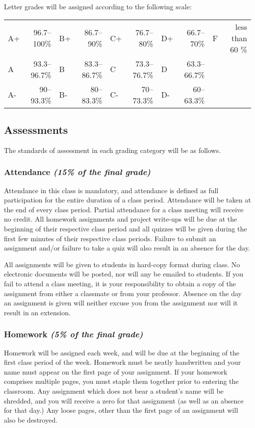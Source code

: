\documentclass[11pt]{article}
\begin{document}
Letter grades will be assigned according to the following scale:

\begin{tabular}{|lr|lr|lr|lr|lr|}
    \hline
    A+ & 96.7--100\% & B+ & 86.7--90\% & C+ & 76.7--80\% & D+ & 66.7--70\% & F & less than 60 \% \\
    A  & 93.3--96.7\% & B & 83.3--86.7\% & C & 73.3--76.7\% & D & 63.3--66.7\% & & \\
    A- & 90--93.3\% & B- & 80--83.3\% & C- & 70--73.3\% & D- & 60--63.3\% & & \\
    \hline
\end{tabular}


\subsection*{Assessments}
The standards of assessment in each grading category will be as follows. 

\subsubsection*{Attendance {\em (15\% of the final grade)}}
Attendance in this class is
mandatory, and attendance is defined as full participation for the
entire duration of a class period. Attendance will be taken at the
end of every class period. Partial attendance for a class meeting
will receive no credit. All homework assignments and project write-ups
will be due at the beginning of their respective class period and all
quizzes will be given during the first few minutes of their respective
class periods. Failure to submit an assignment and/or failure to take
a quiz will also result in an absence for the day.

All assignments will be given to students in hard-copy format during
class. No electronic documents will be posted, nor will any be
emailed to students. If you fail to attend a class meeting, it is
your responsibility to obtain a copy of the assignment from either
a classmate or from your professor. Absence on the day an assignment
is given will neither excuse you from the assignment nor will it
result in an extension.

\subsubsection*{Homework {\em(5\% of the final grade)}}
Homework will be assigned each
week, and will be due at the beginning of the first class period of
the week. Homework must be neatly handwritten and your name must
appear on the first page of your assignment. If your homework
comprises multiple pages, you must staple them together prior to
entering the classroom. Any assignment which does not bear
a student's name will be shredded, and you will receive a zero for
that assignment (as well as an absence for that day.) Any loose pages,
other than the first page of an assignment will also be destroyed.
\end{document}
